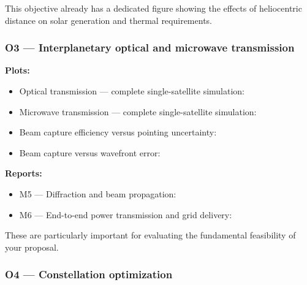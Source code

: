\documentclass{article}
\begin{document}
This objective already has a dedicated figure showing the effects of heliocentric distance on solar generation and thermal requirements.

\subsubsection*{O3 --- Interplanetary optical and microwave transmission}

\textbf{Plots:}

\begin{itemize}
\item Optical transmission --- complete single-satellite simulation: \href{https://github.com/extremefattypunch/Project-Dyson-Sphere/blob/helioswarm-m0-m6/figures/m6/mvp_optical_composite.png}{\textbullet}
\item Microwave transmission --- complete single-satellite simulation: \href{https://github.com/extremefattypunch/Project-Dyson-Sphere/blob/helioswarm-m0-m6/figures/m6/mvp_microwave_composite.png}{\textbullet}
\item Beam capture efficiency versus pointing uncertainty: \href{https://github.com/extremefattypunch/Project-Dyson-Sphere/blob/helioswarm-m0-m6/figures/m6b/capture_vs_pointing.png}{\textbullet}
\item Beam capture versus wavefront error: \href{https://github.com/extremefattypunch/Project-Dyson-Sphere/blob/helioswarm-m0-m6/figures/m6b/capture_vs_wavefront.png}{\textbullet}
\end{itemize}

\textbf{Reports:}

\begin{itemize}
\item M5 --- Diffraction and beam propagation: \href{https://github.com/extremefattypunch/Project-Dyson-Sphere/blob/helioswarm-m0-m6/docs/milestones/M5.md}{\textbullet}
\item M6 --- End-to-end power transmission and grid delivery: \href{https://github.com/extremefattypunch/Project-Dyson-Sphere/blob/helioswarm-m0-m6/docs/milestones/M6.md}{\textbullet}
\end{itemize}

These are particularly important for evaluating the fundamental feasibility of your proposal.

\subsubsection*{O4 --- Constellation optimization}
\end{document}
